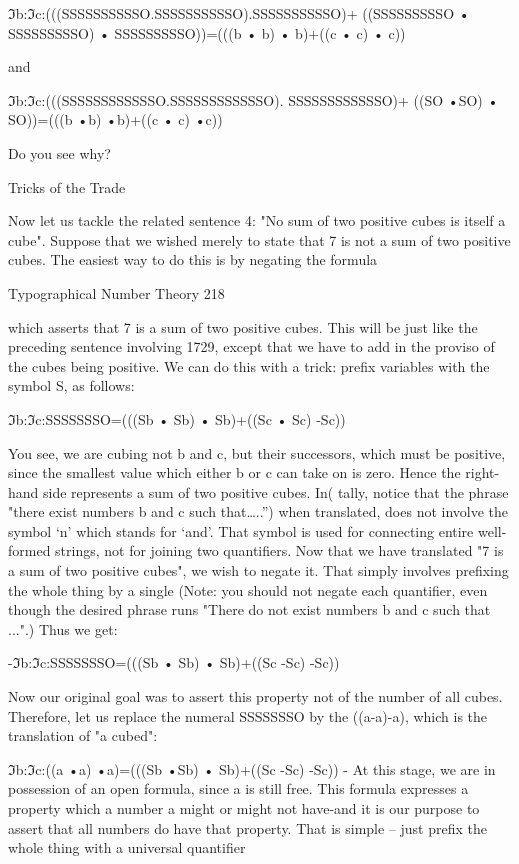             ℑb:ℑc:(((SSSSSSSSSSO.SSSSSSSSSSO).SSSSSSSSSSO)+
     ((SSSSSSSSSO • SSSSSSSSSO) • SSSSSSSSSO))=(((b • b) • b)+((c • c) • c))

                                            and

         ℑb:ℑc:(((SSSSSSSSSSSSO.SSSSSSSSSSSSO). SSSSSSSSSSSSO)+
                     ((SO •SO) • SO))=(((b •b) •b)+((c • c) •c))

Do you see why?

                                   Tricks of the Trade

Now let us tackle the related sentence 4: "No sum of two positive cubes is itself a cube".
Suppose that we wished merely to state that 7 is not a sum of two positive cubes. The
easiest way to do this is by negating the formula


Typographical Number Theory                                                             218

which asserts that 7 is a sum of two positive cubes. This will be just like the preceding
sentence involving 1729, except that we have to add in the proviso of the cubes being
positive. We can do this with a trick: prefix variables with the symbol S, as follows:

                  ℑb:ℑc:SSSSSSSO=(((Sb • Sb) • Sb)+((Sc • Sc) -Sc))

You see, we are cubing not b and c, but their successors, which must be positive, since
the smallest value which either b or c can take on is zero. Hence the right-hand side
represents a sum of two positive cubes. In( tally, notice that the phrase "there exist
numbers b and c such that…..”) when translated, does not involve the symbol `n' which
stands for ‘and’. That symbol is used for connecting entire well-formed strings, not for
joining two quantifiers.
        Now that we have translated "7 is a sum of two positive cubes", we wish to negate
it. That simply involves prefixing the whole thing by a single (Note: you should not
negate each quantifier, even though the desired phrase runs "There do not exist numbers
b and c such that ...".) Thus we get:

                  -ℑb:ℑc:SSSSSSSO=(((Sb • Sb) • Sb)+((Sc -Sc) -Sc))

Now our original goal was to assert this property not of the number of all cubes.
Therefore, let us replace the numeral SSSSSSSO by the ((a-a)-a), which is the translation
of "a cubed":

                   ℑb:ℑc:((a •a) •a)=(((Sb •Sb) • Sb)+((Sc -Sc) -Sc))
    -
At this stage, we are in possession of an open formula, since a is still free. This formula
expresses a property which a number a might or might not have-and it is our purpose to
assert that all numbers do have that property. That is simple -- just prefix the whole thing
with a universal quantifier

